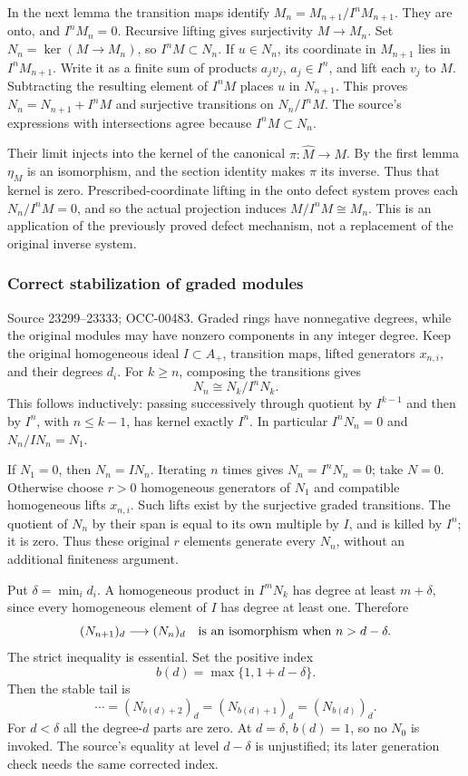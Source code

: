 In the next lemma the transition maps identify \(M_n=M_{n+1}/I^nM_{n+1}\). They are onto, and \(I^nM_n=0\). Recursive lifting gives surjectivity \(M\to M_n\). Set \(N_n=\ker(M\to M_n)\), so \(I^nM\subset N_n\). If \(u\in N_n\), its coordinate in \(M_{n+1}\) lies in \(I^nM_{n+1}\). Write it as a finite sum of products \(a_jv_j\), \(a_j\in I^n\), and lift each \(v_j\) to \(M\). Subtracting the resulting element of \(I^nM\) places \(u\) in \(N_{n+1}\). This proves \(N_n=N_{n+1}+I^nM\) and surjective transitions on \(N_n/I^nM\). The source's expressions with intersections agree because \(I^nM\subset N_n\).

Their limit injects into the kernel of the canonical \(\pi:\widehat M\to M\). By the first lemma \(\eta_M\) is an isomorphism, and the section identity makes \(\pi\) its inverse. Thus that kernel is zero. Prescribed-coordinate lifting in the onto defect system proves each \(N_n/I^nM=0\), and so the actual projection induces \(M/I^nM\cong M_n\). This is an application of the previously proved defect mechanism, not a replacement of the original inverse system.

\subsubsection{Correct stabilization of graded modules}\label{algebra-proof-015-correct-stabilization-of-graded-modules}

Source 23299--23333; OCC-00483. Graded rings have nonnegative degrees, while the original modules may have nonzero components in any integer degree. Keep the original homogeneous ideal \(I\subset A_+\), transition maps, lifted generators \(x_{n,i}\), and their degrees \(d_i\). For \(k\geq n\), composing the transitions gives \[
N_n\cong N_k/I^nN_k .
\] This follows inductively: passing successively through quotient by \(I^{k-1}\) and then by \(I^n\), with \(n\leq k-1\), has kernel exactly \(I^n\). In particular \(I^nN_n=0\) and \(N_n/IN_n=N_1\).

If \(N_1=0\), then \(N_n=IN_n\). Iterating \(n\) times gives \(N_n=I^nN_n=0\); take \(N=0\). Otherwise choose \(r>0\) homogeneous generators of \(N_1\) and compatible homogeneous lifts \(x_{n,i}\). Such lifts exist by the surjective graded transitions. The quotient of \(N_n\) by their span is equal to its own multiple by \(I\), and is killed by \(I^n\); it is zero. Thus these original \(r\) elements generate every \(N_n\), without an additional finiteness argument.

Put \(\delta=\min_i d_i\). A homogeneous product in \(I^mN_k\) has degree at least \(m+\delta\), since every homogeneous element of \(I\) has degree at least one. Therefore \[
(N_{n+1})_d\longrightarrow(N_n)_d
\quad\hbox{is an isomorphism when }n>d-\delta.
\] The strict inequality is essential. Set the positive index \[
b(d)=\max\{1,1+d-\delta\}.
\] Then the stable tail is \[
\cdots=(N_{b(d)+2})_d=(N_{b(d)+1})_d=(N_{b(d)})_d.
\] For \(d<\delta\) all the degree-\(d\) parts are zero. At \(d=\delta\), \(b(d)=1\), so no \(N_0\) is invoked. The source's equality at level \(d-\delta\) is unjustified; its later generation check needs the same corrected index.

